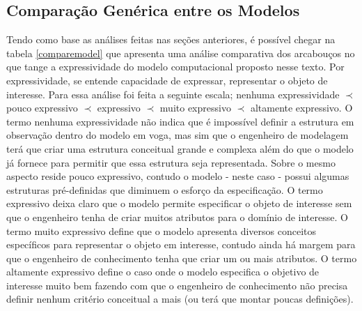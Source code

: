 \subsection{Comparação Genérica entre os Modelos}

Tendo como base as análises feitas nas seções anteriores, é possível chegar na tabela \ref{comparemodel} que apresenta uma análise comparativa dos arcabouços no que tange a expressividade do modelo computacional proposto nesse texto. Por expressividade, se entende capacidade de expressar, representar o objeto de interesse. Para essa análise 
foi feita a seguinte escala; nenhuma expressividade $\prec$ pouco expressivo $\prec$ expressivo $\prec$ muito expressivo $\prec$ altamente expressivo. O termo nenhuma expressividade não indica que é impossível definir a estrutura em observação dentro do modelo em voga, mas sim que o engenheiro de modelagem terá que criar uma estrutura conceitual grande e complexa além do que o modelo já fornece para permitir que essa estrutura seja representada. Sobre o mesmo aspecto reside pouco expressivo, contudo o modelo - neste caso - possui algumas estruturas pré-definidas que diminuem o esforço da especificação. O termo expressivo deixa claro que o modelo permite especificar o objeto de interesse sem que o engenheiro tenha de criar muitos atributos para o domínio de interesse. O termo muito expressivo define que o modelo apresenta diversos conceitos específicos para representar o objeto em interesse, contudo ainda há margem para que o engenheiro de conhecimento tenha que criar um ou mais atributos. O termo altamente expressivo define o caso onde o modelo especifica o objetivo de interesse muito bem fazendo com que o engenheiro de conhecimento não precisa definir nenhum critério conceitual a mais (ou terá que montar poucas definições).   

